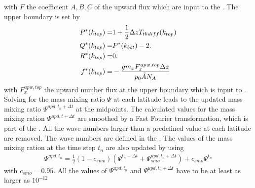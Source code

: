 %
with $F$ the coefficient $A, B, C$ of the upward flux which are
input to the . The upper boundary is set by
%
\begin{align}
  P^*(k_{top}) =& 1+\frac{1}{2}\Delta z T_{thdiff}(k_{top}) \notag \\
  Q^*(k_{top}) =& P^*(k_{bot}) - 2. \notag \\
  R^*(k_{top}) =& 0. \notag \\
  f^*(k_{top}) =& -\frac{g m_x F_x^{upw,top} \Delta z}{p_0 \tilde{A} N_A}
\end{align}
%
with $F_x^{upw,top}$ the upward number flux at the upper boundary
which is input to . \\

%
Solving for the mass mixing ratio $\Psi$ at each latitude leads to
the updated mass mixing ratio $\Psi^{upd, t_n+\Delta t}$ at the
midpoints. The calculated values for the mass mixing ration
$\Psi^{upd, t + \Delta t}$ are smoothed by a Fast Fourier
transformation, which is part of the . All the
wave numbers larger than a predefined value at each latitude are
removed. The wave numbers are defined in the
 . The values of the mass mixing ration at the
time step $t_n$ are also updated by using
%
\begin{align}
  \Psi^{upd,t_n} =  \frac{1}{2}({1-c_{smo}})(\Psi^{t_n-\Delta t}+
     \Psi_{smo}^{upd,t_n+\Delta t}) + c_{smo}\Psi^{t_n}
\end{align}
%
with $c_{smo} = 0.95$. All the values of $\Psi^{upd,t_n}$ and
$\Psi^{upd,t_n+\Delta t}$ have to be at least as larger as
$10^{-12}$
%
